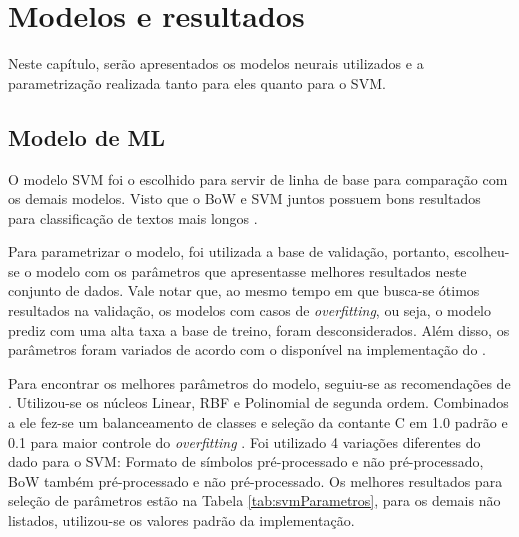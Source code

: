 \chapter[Modelos e resultados]{Modelos e resultados}\label{sec:modelos}

Neste capítulo, serão apresentados os modelos neurais utilizados e a parametrização realizada tanto para eles quanto para o SVM.

\section{Modelo de ML}

O modelo SVM foi o escolhido para servir de linha de base para comparação com os demais modelos. Visto que o BoW e SVM juntos possuem bons resultados para classificação de textos mais longos \cite{wang_baselines_2012}.

Para parametrizar o modelo, foi utilizada a base de validação, portanto, escolheu-se o modelo com os parâmetros que apresentasse melhores resultados neste conjunto de dados. Vale notar que, ao mesmo tempo em que busca-se ótimos resultados na validação, os modelos com casos de \textit{overfitting}, ou seja, o modelo prediz com uma alta taxa a base de treino, foram desconsiderados. Além disso, os parâmetros foram variados de acordo com o disponível na implementação do .

Para encontrar os melhores parâmetros do modelo, seguiu-se as recomendações de . Utilizou-se os núcleos Linear, RBF e Polinomial de segunda ordem. Combinados a ele fez-se um balanceamento de classes e seleção da contante C em 1.0 padrão \cite{pedregosa_scikit-learn:_2011} e 0.1 para maior controle do \textit{overfitting} \cite{wang_baselines_2012}. Foi utilizado 4 variações diferentes do dado para o SVM: Formato de símbolos pré-processado e não pré-processado, BoW também pré-processado e não pré-processado. Os melhores resultados para seleção de parâmetros estão na Tabela \ref{tab:svmParametros}, para os demais não listados, utilizou-se os valores padrão da implementação.

